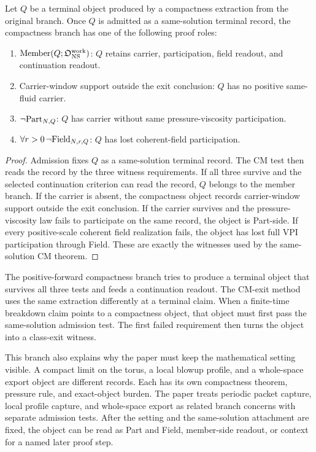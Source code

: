 \begin{proposition}
Let \(Q\) be a terminal object produced by a compactness extraction from the
original branch.
Once \(Q\) is admitted as a same-solution terminal record, the compactness branch
has one of the following proof roles:
\begin{enumerate}[leftmargin=*]
\item \(\mathrm{Member}(Q;\mathfrak O_{\mathrm{NS}}^{\mathrm{work}})\): \(Q\) retains carrier, participation, field readout, and continuation readout.
\item Carrier-window support outside the exit conclusion: \(Q\) has no positive same-fluid carrier.
\item \(\neg\mathrm{Part}_{N,Q}\): \(Q\) has carrier without same pressure-viscosity participation.
\item \(\forall r>0\,\neg\mathrm{Field}_{N,r,Q}\): \(Q\) has lost coherent-field participation.
\end{enumerate}
\end{proposition}

\begin{proof}
Admission fixes \(Q\) as a same-solution terminal record.
The CM test then reads the record by the three witness requirements.
If all three survive and the selected continuation criterion can read the record, \(Q\)
belongs to the member branch.
If the carrier is absent, the compactness object records carrier-window support outside the exit conclusion.
If the carrier survives and the pressure-viscosity law fails to participate on
the same record, the object is Part-side.
If every positive-scale coherent field realization fails, the object has lost
full VPI participation through Field.
These are exactly the witnesses used by the same-solution CM theorem.
\end{proof}

The positive-forward compactness branch tries to produce a terminal object that
survives all three tests and feeds a continuation readout.
The CM-exit method uses the same extraction differently at a terminal claim.
When a finite-time breakdown claim points to a compactness object, that object
must first pass the same-solution admission test.
The first failed requirement then turns the object into a class-exit witness.

This branch also explains why the paper must keep the mathematical setting
visible.
A compact limit on the torus, a local blowup profile, and a whole-space export
object are different records.
Each has its own compactness theorem, pressure rule, and exact-object burden.
The paper treats periodic packet capture, local profile capture, and whole-space
export as related branch concerns with separate admission tests.
After the setting and the same-solution attachment are fixed, the object can be
read as Part and Field, member-side readout, or context for a named later
proof step.
